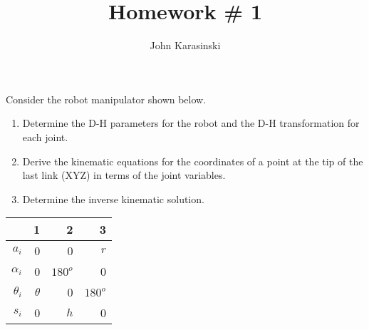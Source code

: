 \documentclass[onecolumn,10pt]{jhwhw}
\author{John Karasinski}
\title{Homework \# 1}
\begin{document}

\problem{}
Consider the robot manipulator shown below.
\begin{enumerate}
    \item Determine the D-H parameters for the robot and the D-H transformation for each joint.
    \item Derive the kinematic equations for the coordinates of a point at the tip of the last link (XYZ) in terms of the joint variables.
    \item Determine the inverse kinematic solution.
\end{enumerate}

\begin{center}
\begin{tabular}{r|rrr}
& 1 & 2 & 3 \\
\midrule
$a_i$ &      0 & 0 & $r$ \\
$\alpha_i$ & 0 & $180^o$ & 0 \\    
$\theta_i$ & $\theta$ & 0 & $180^o$ \\ 
$s_i$ &      0 & $h$ & 0 \\
\end{tabular}
\end{center}
\end{document}
